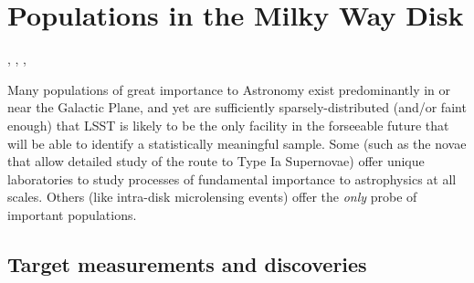 %
%
%

\section{Populations in the Milky Way Disk}
\def\secname{MW_Disk}\label{sec:\secname}

, , , 

Many populations of great importance to Astronomy exist predominantly
in or near the Galactic Plane, and yet are sufficiently
sparsely-distributed (and/or faint enough) that LSST is likely to be
the only facility in the forseeable future that will be able to
identify a statistically meaningful sample. Some (such as the novae
that allow detailed study of the route to Type Ia Supernovae) offer
unique laboratories to study processes of fundamental importance to
astrophysics at all scales. Others (like intra-disk microlensing
events) offer the {\it only} probe of important populations.



\subsection{Target measurements and discoveries}
\label{sec:\secname:MW_Disk_targets}



